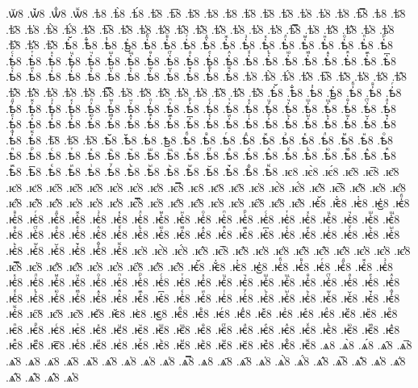 {.ѡ꙼8
.ѡ꙽8
.ѡꚞ8
.ѡꚟ8
.ѣ8
.ѣ̀8
.ѣ́8
.ѣ̂8
.ѣ̅8
.ѣ̆8
.ѣ̇8
.ѣ̈8
.ѣ̋8
.ѣ̏8
.ѣ̑8
.ѣ̓8
.ѣ̔8
.ѣ̾8
.ѣ̿8
.ѣ͘8
.ѣ҃8
.ѣ҄8
.ѣ҅8
.ѣ҅̀8
.ѣ҅́8
.ѣ҅̂8
.ѣ҅̅8
.ѣ҅̆8
.ѣ҅̇8
.ѣ҅̈8
.ѣ҅̋8
.ѣ҅̏8
.ѣ҅̑8
.ѣ҅̓8
.ѣ҅̔8
.ѣ҅̾8
.ѣ҅̿8
.ѣ҅͘8
.ѣ҅҃8
.ѣ҅҄8
.ѣ҅҅8
.ѣ҅҆8
.ѣ҅҇8
.ѣ҅᷀8
.ѣ҅᷁8
.ѣ҅᷶8
.ѣ᷷҅8
.ѣ᷸҅8
.ѣ᷹҅8
.ѣ҅ⷠ8
.ѣ҅ⷡ8
.ѣ҅ⷢ8
.ѣ҅ⷣ8
.ѣ҅ⷤ8
.ѣ҅ⷥ8
.ѣ҅ⷦ8
.ѣ҅ⷧ8
.ѣ҅ⷨ8
.ѣ҅ⷩ8
.ѣ҅ⷪ8
.ѣ҅ⷫ8
.ѣ҅ⷬ8
.ѣ҅ⷭ8
.ѣ҅ⷮ8
.ѣ҅ⷯ8
.ѣ҅ⷰ8
.ѣ҅ⷱ8
.ѣ҅ⷲ8
.ѣ҅ⷳ8
.ѣ҅ⷴ8
.ѣ҅ⷵ8
.ѣ҅ⷶ8
.ѣ҅ⷷ8
.ѣ҅ⷸ8
.ѣ҅ⷹ8
.ѣ҅ⷺ8
.ѣ҅ⷻ8
.ѣ҅ⷼ8
.ѣ҅ⷽ8
.ѣ҅ⷾ8
.ѣ҅ⷿ8
.ѣ҅꙯8
.ѣ҅ꙴ8
.ѣ҅ꙵ8
.ѣ҅ꙶ8
.ѣ҅ꙷ8
.ѣ҅ꙸ8
.ѣ҅ꙹ8
.ѣ҅ꙺ8
.ѣ҅ꙻ8
.ѣ҅꙼8
.ѣ҅꙽8
.ѣ҅ꚞ8
.ѣ҅ꚟ8
.ѣ҆8
.ѣ҆̀8
.ѣ҆́8
.ѣ҆̂8
.ѣ҆̅8
.ѣ҆̆8
.ѣ҆̇8
.ѣ҆̈8
.ѣ҆̋8
.ѣ҆̏8
.ѣ҆̑8
.ѣ҆̓8
.ѣ҆̔8
.ѣ҆̾8
.ѣ҆̿8
.ѣ҆͘8
.ѣ҆҃8
.ѣ҆҄8
.ѣ҆҅8
.ѣ҆҆8
.ѣ҆҇8
.ѣ҆᷀8
.ѣ҆᷁8
.ѣ҆᷶8
.ѣ᷷҆8
.ѣ᷸҆8
.ѣ᷹҆8
.ѣ҆ⷠ8
.ѣ҆ⷡ8
.ѣ҆ⷢ8
.ѣ҆ⷣ8
.ѣ҆ⷤ8
.ѣ҆ⷥ8
.ѣ҆ⷦ8
.ѣ҆ⷧ8
.ѣ҆ⷨ8
.ѣ҆ⷩ8
.ѣ҆ⷪ8
.ѣ҆ⷫ8
.ѣ҆ⷬ8
.ѣ҆ⷭ8
.ѣ҆ⷮ8
.ѣ҆ⷯ8
.ѣ҆ⷰ8
.ѣ҆ⷱ8
.ѣ҆ⷲ8
.ѣ҆ⷳ8
.ѣ҆ⷴ8
.ѣ҆ⷵ8
.ѣ҆ⷶ8
.ѣ҆ⷷ8
.ѣ҆ⷸ8
.ѣ҆ⷹ8
.ѣ҆ⷺ8
.ѣ҆ⷻ8
.ѣ҆ⷼ8
.ѣ҆ⷽ8
.ѣ҆ⷾ8
.ѣ҆ⷿ8
.ѣ҆꙯8
.ѣ҆ꙴ8
.ѣ҆ꙵ8
.ѣ҆ꙶ8
.ѣ҆ꙷ8
.ѣ҆ꙸ8
.ѣ҆ꙹ8
.ѣ҆ꙺ8
.ѣ҆ꙻ8
.ѣ҆꙼8
.ѣ҆꙽8
.ѣ҆ꚞ8
.ѣ҆ꚟ8
.ѣ҇8
.ѣ᷀8
.ѣ᷁8
.ѣ᷶8
.ѣ᷷8
.ѣ᷸8
.ѣ᷹8
.ѣⷠ8
.ѣⷡ8
.ѣⷢ8
.ѣⷣ8
.ѣⷤ8
.ѣⷥ8
.ѣⷦ8
.ѣⷧ8
.ѣⷨ8
.ѣⷩ8
.ѣⷪ8
.ѣⷫ8
.ѣⷬ8
.ѣⷭ8
.ѣⷮ8
.ѣⷯ8
.ѣⷰ8
.ѣⷱ8
.ѣⷲ8
.ѣⷳ8
.ѣⷴ8
.ѣⷵ8
.ѣⷶ8
.ѣⷷ8
.ѣⷸ8
.ѣⷹ8
.ѣⷺ8
.ѣⷻ8
.ѣⷼ8
.ѣⷽ8
.ѣⷾ8
.ѣⷿ8
.ѣ꙯8
.ѣꙴ8
.ѣꙵ8
.ѣꙶ8
.ѣꙷ8
.ѣꙸ8
.ѣꙹ8
.ѣꙺ8
.ѣꙻ8
.ѣ꙼8
.ѣ꙽8
.ѣꚞ8
.ѣꚟ8
.ѥ8
.ѥ̀8
.ѥ́8
.ѥ̂8
.ѥ̅8
.ѥ̆8
.ѥ̇8
.ѥ̈8
.ѥ̋8
.ѥ̏8
.ѥ̑8
.ѥ̓8
.ѥ̔8
.ѥ̾8
.ѥ̿8
.ѥ͘8
.ѥ҃8
.ѥ҄8
.ѥ҅8
.ѥ҅̀8
.ѥ҅́8
.ѥ҅̂8
.ѥ҅̅8
.ѥ҅̆8
.ѥ҅̇8
.ѥ҅̈8
.ѥ҅̋8
.ѥ҅̏8
.ѥ҅̑8
.ѥ҅̓8
.ѥ҅̔8
.ѥ҅̾8
.ѥ҅̿8
.ѥ҅͘8
.ѥ҅҃8
.ѥ҅҄8
.ѥ҅҅8
.ѥ҅҆8
.ѥ҅҇8
.ѥ҅᷀8
.ѥ҅᷁8
.ѥ҅᷶8
.ѥ᷷҅8
.ѥ᷸҅8
.ѥ᷹҅8
.ѥ҅ⷠ8
.ѥ҅ⷡ8
.ѥ҅ⷢ8
.ѥ҅ⷣ8
.ѥ҅ⷤ8
.ѥ҅ⷥ8
.ѥ҅ⷦ8
.ѥ҅ⷧ8
.ѥ҅ⷨ8
.ѥ҅ⷩ8
.ѥ҅ⷪ8
.ѥ҅ⷫ8
.ѥ҅ⷬ8
.ѥ҅ⷭ8
.ѥ҅ⷮ8
.ѥ҅ⷯ8
.ѥ҅ⷰ8
.ѥ҅ⷱ8
.ѥ҅ⷲ8
.ѥ҅ⷳ8
.ѥ҅ⷴ8
.ѥ҅ⷵ8
.ѥ҅ⷶ8
.ѥ҅ⷷ8
.ѥ҅ⷸ8
.ѥ҅ⷹ8
.ѥ҅ⷺ8
.ѥ҅ⷻ8
.ѥ҅ⷼ8
.ѥ҅ⷽ8
.ѥ҅ⷾ8
.ѥ҅ⷿ8
.ѥ҅꙯8
.ѥ҅ꙴ8
.ѥ҅ꙵ8
.ѥ҅ꙶ8
.ѥ҅ꙷ8
.ѥ҅ꙸ8
.ѥ҅ꙹ8
.ѥ҅ꙺ8
.ѥ҅ꙻ8
.ѥ҅꙼8
.ѥ҅꙽8
.ѥ҅ꚞ8
.ѥ҅ꚟ8
.ѥ҆8
.ѥ҆̀8
.ѥ҆́8
.ѥ҆̂8
.ѥ҆̅8
.ѥ҆̆8
.ѥ҆̇8
.ѥ҆̈8
.ѥ҆̋8
.ѥ҆̏8
.ѥ҆̑8
.ѥ҆̓8
.ѥ҆̔8
.ѥ҆̾8
.ѥ҆̿8
.ѥ҆͘8
.ѥ҆҃8
.ѥ҆҄8
.ѥ҆҅8
.ѥ҆҆8
.ѥ҆҇8
.ѥ҆᷀8
.ѥ҆᷁8
.ѥ҆᷶8
.ѥ᷷҆8
.ѥ᷸҆8
.ѥ᷹҆8
.ѥ҆ⷠ8
.ѥ҆ⷡ8
.ѥ҆ⷢ8
.ѥ҆ⷣ8
.ѥ҆ⷤ8
.ѥ҆ⷥ8
.ѥ҆ⷦ8
.ѥ҆ⷧ8
.ѥ҆ⷨ8
.ѥ҆ⷩ8
.ѥ҆ⷪ8
.ѥ҆ⷫ8
.ѥ҆ⷬ8
.ѥ҆ⷭ8
.ѥ҆ⷮ8
.ѥ҆ⷯ8
.ѥ҆ⷰ8
.ѥ҆ⷱ8
.ѥ҆ⷲ8
.ѥ҆ⷳ8
.ѥ҆ⷴ8
.ѥ҆ⷵ8
.ѥ҆ⷶ8
.ѥ҆ⷷ8
.ѥ҆ⷸ8
.ѥ҆ⷹ8
.ѥ҆ⷺ8
.ѥ҆ⷻ8
.ѥ҆ⷼ8
.ѥ҆ⷽ8
.ѥ҆ⷾ8
.ѥ҆ⷿ8
.ѥ҆꙯8
.ѥ҆ꙴ8
.ѥ҆ꙵ8
.ѥ҆ꙶ8
.ѥ҆ꙷ8
.ѥ҆ꙸ8
.ѥ҆ꙹ8
.ѥ҆ꙺ8
.ѥ҆ꙻ8
.ѥ҆꙼8
.ѥ҆꙽8
.ѥ҆ꚞ8
.ѥ҆ꚟ8
.ѥ҇8
.ѥ᷀8
.ѥ᷁8
.ѥ᷶8
.ѥ᷷8
.ѥ᷸8
.ѥ᷹8
.ѥⷠ8
.ѥⷡ8
.ѥⷢ8
.ѥⷣ8
.ѥⷤ8
.ѥⷥ8
.ѥⷦ8
.ѥⷧ8
.ѥⷨ8
.ѥⷩ8
.ѥⷪ8
.ѥⷫ8
.ѥⷬ8
.ѥⷭ8
.ѥⷮ8
.ѥⷯ8
.ѥⷰ8
.ѥⷱ8
.ѥⷲ8
.ѥⷳ8
.ѥⷴ8
.ѥⷵ8
.ѥⷶ8
.ѥⷷ8
.ѥⷸ8
.ѥⷹ8
.ѥⷺ8
.ѥⷻ8
.ѥⷼ8
.ѥⷽ8
.ѥⷾ8
.ѥⷿ8
.ѥ꙯8
.ѥꙴ8
.ѥꙵ8
.ѥꙶ8
.ѥꙷ8
.ѥꙸ8
.ѥꙹ8
.ѥꙺ8
.ѥꙻ8
.ѥ꙼8
.ѥ꙽8
.ѥꚞ8
.ѥꚟ8
.ѧ8
.ѧ̀8
.ѧ́8
.ѧ̂8
.ѧ̅8
.ѧ̆8
.ѧ̇8
.ѧ̈8
.ѧ̋8
.ѧ̏8
.ѧ̑8
.ѧ̓8
.ѧ̔8
.ѧ̾8
.ѧ̿8
.ѧ͘8
.ѧ҃8
.ѧ҄8
.ѧ҅8
.ѧ҅̀8
.ѧ҅́8
.ѧ҅̂8
.ѧ҅̅8
.ѧ҅̆8
.ѧ҅̇8
.ѧ҅̈8
.ѧ҅̋8
.ѧ҅̏8
.ѧ҅̑8
.ѧ҅̓8
}
